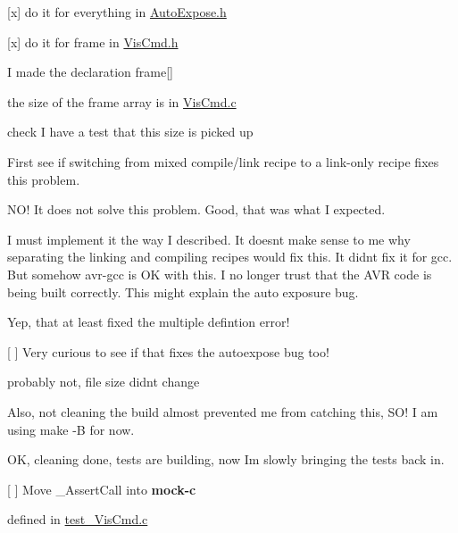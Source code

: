 \begin{DoxyItemize}
\begin{DoxyItemize}
\begin{DoxyItemize}
\item \mbox{[}x\mbox{]} do it for everything in \mbox{\hyperlink{AutoExpose_8h}{Auto\+Expose.\+h}}
\item \mbox{[}x\mbox{]} do it for {\ttfamily frame} in \mbox{\hyperlink{VisCmd_8h}{Vis\+Cmd.\+h}}
\begin{DoxyItemize}
\item I made the declaration {\ttfamily frame\mbox{[}\mbox{]}}
\item the size of the frame array is in \mbox{\hyperlink{VisCmd_8c_source}{Vis\+Cmd.\+c}}
\item check I have a test that this size is picked up
\end{DoxyItemize}
\end{DoxyItemize}
\item First see if switching from mixed compile/link recipe to a link-\/only recipe fixes this problem.
\begin{DoxyItemize}
\item NO! It does not solve this problem. Good, that was what I expected.
\end{DoxyItemize}
\item I must implement it the way I described. It doesn\textquotesingle{}t make sense to me why separating the linking and compiling recipes would fix this. It didn\textquotesingle{}t fix it for gcc. But somehow avr-\/gcc is OK with this. I no longer trust that the AVR code is being built correctly. This might explain the auto exposure bug.
\item Yep, that at least fixed the multiple defintion error!
\item \mbox{[} \mbox{]} Very curious to see if that fixes the autoexpose bug too!
\begin{DoxyItemize}
\item probably not, file size didn\textquotesingle{}t change
\end{DoxyItemize}
\item Also, not cleaning the build almost prevented me from catching this, SO! I am using make -\/B for now.
\item OK, cleaning done, tests are building, now I\textquotesingle{}m slowly bringing the tests back in.
\item \mbox{[} \mbox{]} Move {\ttfamily \+\_\+\+Assert\+Call} into {\bfseries{mock-\/c}}
\begin{DoxyItemize}
\item defined in {\ttfamily \mbox{\hyperlink{test__VisCmd_8c_source}{test\+\_\+\+Vis\+Cmd.\+c}}}
\end{DoxyItemize}
\end{DoxyItemize}
\end{DoxyItemize}

